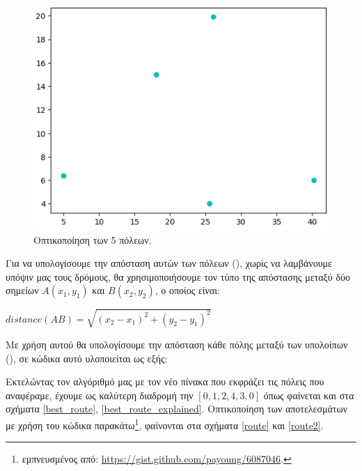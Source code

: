 \begin{figure}
    \centering
    \includegraphics[scale=0.45]{2947_thesis/pictures/map1.png} 
    \caption{Οπτικοποίηση των 5 πόλεων.}
    \label{map1}
\end{figure}

Για να υπολογίσουμε την απόσταση αυτών των πόλεων (), χωρίς να λαμβάνουμε υπόψιν μας τους δρόμους, θα χρησιμοποιήσουμε τον τύπο της απόστασης μεταξύ δύο σημείων $A(x_1,y_1)$ και $B(x_2,y_2)$, ο οποίος είναι: 
\begin{center}
   $distance(AB) = \sqrt{(x_2-x_1)^2+(y_2-y_1)^2}$ 
\end{center}
Με χρήση αυτού θα υπολογίσουμε την απόσταση κάθε πόλης μεταξύ των υπολοίπων (), σε κώδικα αυτό υλοποιείται ως εξής:


Εκτελώντας τον αλγόριθμό μας με τον νέο πίνακα  που εκφράζει τις πόλεις που αναφέραμε, έχουμε ως καλύτερη διαδρομή την $[0, 1, 2, 4, 3, 0]$ όπως φαίνεται και στα σχήματα \ref{best_route}, \ref{best_route_explained}. Οπτικοποίηση των αποτελεσμάτων με χρήση του κώδικα παρακάτω\footnote{εμπνευσμένος από: \url{https://gist.github.com/payoung/6087046}.}, φαίνονται στα σχήματα \ref{route} και \ref{route2}.

